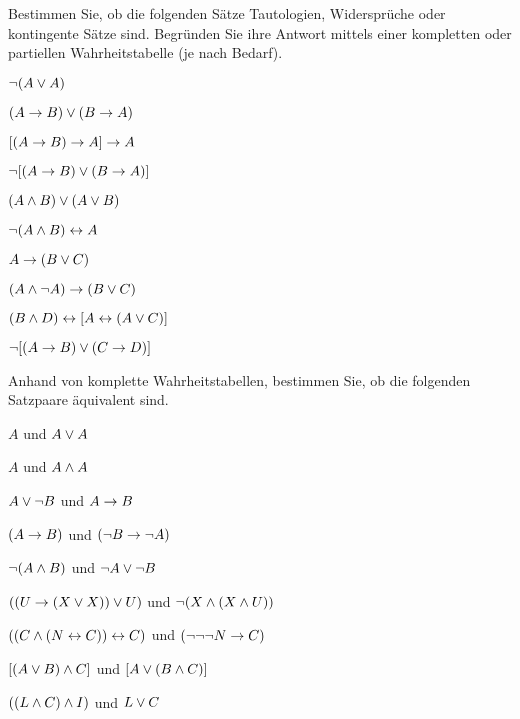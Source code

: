 \noindent\problempart
\label{pr.TT.TTorC4}
Bestimmen Sie, ob die folgenden Sätze Tautologien, Widersprüche oder kontingente Sätze sind. Begründen Sie ihre Antwort mittels einer kompletten oder partiellen Wahrheitstabelle (je nach Bedarf).
\begin{earg}
\item  $\neg (A \vee A)$\vspace{.5ex}							%
\item $(A \rightarrow B) \vee (B \rightarrow A)$\vspace{.5ex}					%
\item $[(A \rightarrow B) \rightarrow A] \rightarrow A$\vspace{.5ex}					%
\item $\neg[( A \rightarrow B) \vee (B \rightarrow A)]$\vspace{.5ex}			%
\item $(A \wedge B) \vee (A \vee B)$\vspace{.5ex} 				%
\item $\neg(A\wedge B) \leftrightarrow A$\vspace{.5ex} 					%
\item $A\rightarrow(B\vee C)$\vspace{.5ex} 							%
\item $(A \wedge\neg A) \rightarrow (B \vee C)$\vspace{.5ex} 			%
\item $(B\wedge D) \leftrightarrow [A \leftrightarrow(A \vee C)]$\vspace{.5ex}			%
\item $\neg[(A \rightarrow B) \vee (C \rightarrow D)]$\vspace{.5ex} 			%
\end{earg}



\noindent\problempart
Anhand von komplette Wahrheitstabellen, bestimmen Sie, ob die folgenden Satzpaare äquivalent sind.
\begin{earg}
\item $A$ und $A \vee A$
\item $A$ und $A \wedge A$
\item $A \vee \neg B$ und $A\rightarrow B$
\item $(A \rightarrow B)$ und $(\neg B \rightarrow \neg A)$
\item $\neg(A \wedge B)$ und $\neg A \vee \neg B$
\item $ ((U \rightarrow (X \vee X)) \vee U)$ und $\neg (X \wedge (X \wedge U))$
\item $ ((C \wedge (N \leftrightarrow C)) \leftrightarrow C)$ und $(\neg \neg \neg N \rightarrow C)$
\item $[(A \vee B) \wedge C]$ und $[A \vee (B \wedge C)]$
\item $((L \wedge C) \wedge I)$ und $L \vee C$
\end{earg}



